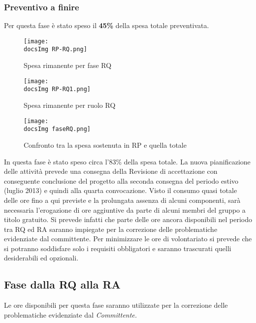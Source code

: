 {{{	  }
	  
	\subsubsection{Preventivo a finire}{
	
	 Per questa fase è stato speso il \textbf{45\%} della spesa totale preventivata.
	\begin{figure}[h!]
	\centering
		\texttt{[image: \\docsImg RP-RQ.png]}
		\caption{Spesa rimanente per fase RQ}  	
	\end{figure}
	\begin{figure}[h!]
	\centering
		\texttt{[image: \\docsImg RP-RQ1.png]}
		\caption{Spesa rimanente per ruolo RQ} 
	
	\end{figure}
	
	\begin{figure}[h!]
	\centering
		\texttt{[image: \\docsImg faseRQ.png]}
		\caption{Confronto tra la spesa sostenuta in RP e quella totale} 
	
	\end{figure}
	
\newpage
In questa fase è stato speso circa l'83\% della spesa totale.
La nuova pianificazione delle attività prevede una consegna della Revisione di accettazione con conseguente
conclusione del progetto alla seconda consegna del periodo estivo (luglio 2013) e quindi alla quarta convocazione. Visto il consumo quasi totale delle ore fino a qui previste e la prolungata assenza di alcuni componenti, sarà necessaria l’erogazione di ore aggiuntive da parte di alcuni membri del gruppo a titolo gratuito. Si prevede infatti che parte delle ore ancora disponibili nel periodo tra RQ ed RA saranno impiegate per la correzione delle problematiche evidenziate dal committente. Per minimizzare le ore di volontariato si prevede che si potranno soddisfare solo i requisiti obbligatori e saranno trascurati quelli desiderabili ed opzionali.
	}
	
\newpage	
	\subsection{Fase dalla RQ alla RA}{
	
	Le ore disponibili per questa fase saranno utilizzate per la correzione delle problematiche evidenziate dal \textit{Committente.}\\
	
	
}}}
